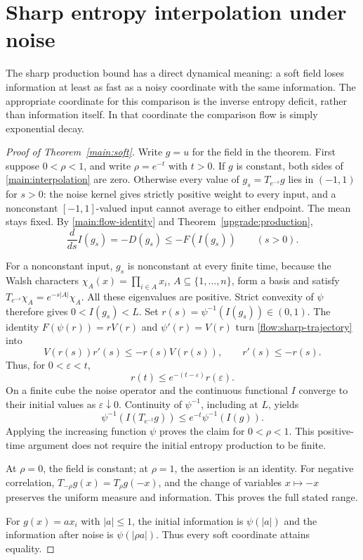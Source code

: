 \section{Sharp entropy interpolation under noise}
\label{flow:section}

The sharp production bound has a direct dynamical meaning: a soft
field loses information at least as fast as a noisy coordinate with
the same information.  The appropriate coordinate for this comparison
is the inverse entropy deficit, rather than information itself.
In that coordinate the comparison flow is simply exponential decay.

\begin{proof}[Proof of Theorem~\ref{main:soft}]
Write $g=u$ for the field in the theorem.
First suppose $0<\rho<1$, and write $\rho=e^{-t}$ with $t>0$.
If $g$ is constant, both sides of \eqref{main:interpolation} are zero.
Otherwise every value of $g_s=T_{e^{-s}}g$ lies in $(-1,1)$ for
$s>0$: the noise kernel gives strictly positive weight to every input,
and a nonconstant $[-1,1]$-valued input cannot average to either
endpoint.  The mean stays fixed.  By
\eqref{main:flow-identity} and Theorem~\ref{upgrade:production},
\begin{equation}
 \frac{d}{ds}I(g_s)=-D(g_s)\le-F(I(g_s))
 \qquad(s>0).
 \label{flow:sharp-trajectory}
\end{equation}

For a nonconstant input, $g_s$ is nonconstant at every finite time,
because the Walsh characters $\chi_A(x)=\prod_{i\in A}x_i$,
$A\subseteq\{1,\ldots,n\}$, form a basis and satisfy
$T_{e^{-s}}\chi_A=e^{-s|A|}\chi_A$. All these eigenvalues are positive.  Strict convexity of $\psi$ therefore gives
$0<I(g_s)<L$.  Set $r(s)=\psi^{-1}(I(g_s))\in(0,1)$.
The identity $F(\psi(r))=rV(r)$ and $\psi'(r)=V(r)$ turn
\eqref{flow:sharp-trajectory} into
\[
 V(r(s))r'(s)\le-r(s)V(r(s)),\qquad r'(s)\le-r(s).
\]
Thus, for $0<\varepsilon<t$,
\[
 r(t)\le e^{-(t-\varepsilon)}r(\varepsilon).
\]
On a finite cube the noise operator and the continuous functional
$I$ converge to their initial values as $\varepsilon\downarrow0$.
Continuity of $\psi^{-1}$, including at $L$, yields
\[
 \psi^{-1}(I(T_{e^{-t}}g))
 \le e^{-t}\psi^{-1}(I(g)).
\]
Applying the increasing function $\psi$ proves the claim for
$0<\rho<1$.  This positive-time argument does not require the
initial entropy production to be finite.

At $\rho=0$, the field is constant; at $\rho=1$, the assertion
is an identity.  For negative correlation,
$T_{-\rho}g(x)=T_\rho g(-x)$, and the change of variables
$x\mapsto-x$ preserves the uniform measure and information.
This proves the full stated range.

For $g(x)=a x_i$ with $|a|\le1$, the initial information is
$\psi(|a|)$ and the information after noise is
$\psi(|\rho a|)$. Thus every soft coordinate attains equality.
\end{proof}


